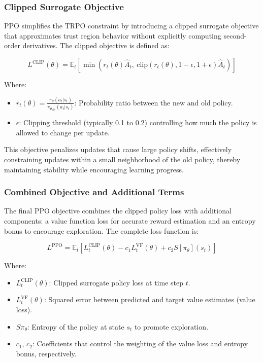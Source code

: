 \documentclass[12pt,oneside,openright,a4paper]{cpe-english-project}
\begin{document}
\subsubsection{Clipped Surrogate Objective}
PPO simplifies the TRPO constraint by introducing a clipped surrogate objective that approximates trust region behavior without explicitly computing second-order derivatives. The clipped objective is defined as:

\begin{equation}
L^{\text{CLIP}}(\theta) = \mathbb{E}_t \left[ \min \left( r_t(\theta) \hat{A}_t, \ \text{clip}\left(r_t(\theta), 1 - \epsilon, 1 + \epsilon\right) \hat{A}_t \right) \right]
\end{equation}

Where:
\begin{itemize}
\item $r_t(\theta) = \frac{\pi_{\theta}(a_t | s_t)}{\pi_{\theta_{\text{old}}}(a_t | s_t)}$: Probability ratio between the new and old policy.
\item $\epsilon$: Clipping threshold (typically 0.1 to 0.2) controlling how much the policy is allowed to change per update.
\end{itemize}

This objective penalizes updates that cause large policy shifts, effectively constraining updates within a small neighborhood of the old policy, thereby maintaining stability while encouraging learning progress.

\subsubsection{Combined Objective and Additional Terms}
The final PPO objective combines the clipped policy loss with additional components: a value function loss for accurate reward estimation and an entropy bonus to encourage exploration. The complete loss function is:

\begin{equation}
L^{\text{PPO}} = \mathbb{E}_t \left[ L^{\text{CLIP}}_t(\theta) - c_1 L^{\text{VF}}_t(\theta) + c_2 S[\pi_{\theta}](s_t) \right]
\end{equation}

Where:
\begin{itemize}
\item $L^{\text{CLIP}}_t(\theta)$: Clipped surrogate policy loss at time step $t$.
\item $L^{\text{VF}}_t(\theta)$: Squared error between predicted and target value estimates (value loss).
\item $S\pi_{\theta}$: Entropy of the policy at state $s_t$ to promote exploration.
\item $c_1$, $c_2$: Coefficients that control the weighting of the value loss and entropy bonus, respectively.
\end{itemize}
\end{document}
